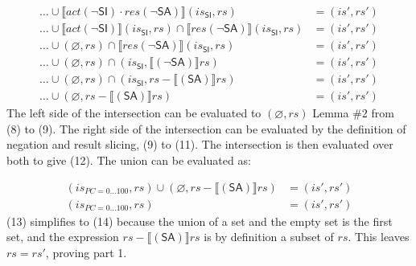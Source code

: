 \documentclass[12pt, letterpaper]{article}
\let\emptyset\varnothing
\newcommand\interp[1]{\llbracket #1 \rrbracket}
\begin{document}
 {\fontsize{10pt}{12pt}\selectfont
 \begin{align}
     \ldots \cup %
     \interp{ \mathit{act}(\neg\mathsf{SI}) \cdot
      \mathit{res}(\neg\mathsf{SA}) } (\mathit{is_{\mathsf{SI}}}, \mathit{rs})
     &=
     (\mathit{is}', \mathit{rs}')
     \\
     \ldots \cup %
     \interp{ \mathit{act}(\neg\mathsf{SI}) } (\mathit{is_{\mathsf{SI}}}, \mathit{rs}) \cap
     \interp{ \mathit{res}(\neg\mathsf{SA}) } (\mathit{is_{\mathsf{SI}}}, \mathit{rs})
     &=
     (\mathit{is}', \mathit{rs}')
     \\
     \ldots \cup 
     (\emptyset, \mathit{rs}) \cap
     \interp{ \mathit{res}(\neg\mathsf{SA}) } (\mathit{is_{\mathsf{SI}}}, \mathit{rs})
     &=
     (\mathit{is}', \mathit{rs}')
     \\ %
     \ldots \cup 
     (\emptyset, \mathit{rs}) \cap
     (\mathit{is_{\mathsf{SI}}}, \interp{ (\neg\mathsf{SA}) } \mathit{rs})
     &=
     (\mathit{is}', \mathit{rs}')
     \\
     \ldots \cup 
     (\emptyset, \mathit{rs}) \cap
     (\mathit{is_{\mathsf{SI}}}, \mathit{rs} - \interp{ (\mathsf{SA}) } \mathit{rs})
     &=
     (\mathit{is}', \mathit{rs}') %
     \\
     \ldots \cup 
     (\emptyset, \mathit{rs} - \interp{ (\mathsf{SA}) } \mathit{rs})
     &=
     (\mathit{is}', \mathit{rs}')
 \end{align}
 }%
     The left side of the intersection can be evaluated to $(\emptyset, \mathit{rs})$ Lemma \#2 from (8) to (9). The right side of the intersection can be evaluated by the definition of negation and result slicing, (9) to (11).  The intersection is then evaluated over both to give (12).  The union can be evaluated as:
 \par\nobreak
 {\fontsize{10pt}{12pt}\selectfont
 \begin{align}
     (\mathit{is_{PC=0\ldots100}}, \mathit{rs}) \cup 
     (\emptyset, \mathit{rs} - \interp{ (\mathsf{SA}) } \mathit{rs})
     &=
     (\mathit{is}', \mathit{rs}')
     \\
     (\mathit{is_{PC=0\ldots100}}, \mathit{rs})
     &=
     (\mathit{is}', \mathit{rs}')
 \end{align}
 }%
     (13) simplifies to (14) because the union of a set and the empty set is the first set, and the expression $\mathit{rs} - \interp{ (\mathsf{SA}) } \mathit{rs}$ is by definition a subset of $\mathit{rs}$.  This leaves $\mathit{rs} = \mathit{rs}'$, proving part 1. 
\end{document}
